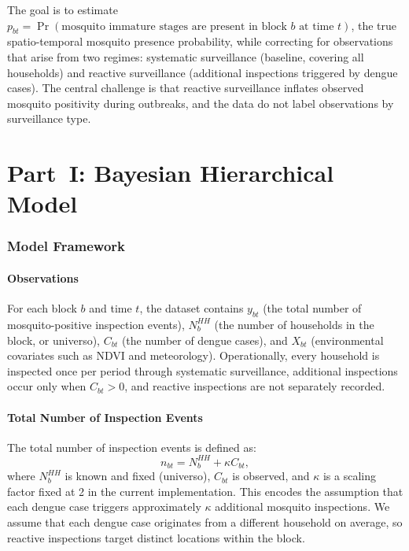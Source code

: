 \documentclass[12pt,a4paper]{article}
\begin{document}
The goal is to estimate $p_{bt} = \Pr(\text{mosquito immature stages are present in block } b \text{ at time } t)$, the true spatio-temporal mosquito presence probability, while correcting for observations that arise from two regimes: systematic surveillance (baseline, covering all households) and reactive surveillance (additional inspections triggered by dengue cases). The central challenge is that reactive surveillance inflates observed mosquito positivity during outbreaks, and the data do not label observations by surveillance type.

\part*{Part~I: Bayesian Hierarchical Model}

\section{Model Framework}

\subsection{Observations}

For each block $b$ and time $t$, the dataset contains $y_{bt}$ (the total number of mosquito-positive inspection events), $N_b^{HH}$ (the number of households in the block, or universo), $C_{bt}$ (the number of dengue cases), and $X_{bt}$ (environmental covariates such as NDVI and meteorology). Operationally, every household is inspected once per period through systematic surveillance, additional inspections occur only when $C_{bt} > 0$, and reactive inspections are not separately recorded.

\subsection{Total Number of Inspection Events}

The total number of inspection events is defined as:
\begin{equation}
n_{bt} = N_b^{HH} + \kappa C_{bt},
\end{equation}
where $N_b^{HH}$ is known and fixed (universo), $C_{bt}$ is observed, and $\kappa$ is a scaling factor fixed at 2 in the current implementation. This encodes the assumption that each dengue case triggers approximately $\kappa$ additional mosquito inspections. We assume that each dengue case originates from a different household on average, so reactive inspections target distinct locations within the block.
\end{document}
